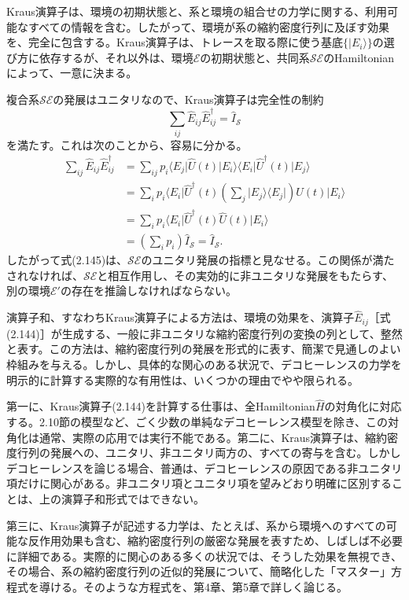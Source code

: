 Kraus演算子は、環境の初期状態と、系と環境の組合せの力学に関する、利用可能なすべての情報を含む。したがって、環境が系の縮約密度行列に及ぼす効果を、完全に包含する。Kraus演算子は、トレースを取る際に使う基底$\{\lvert E_i\rangle\}$の選び方に依存するが、それ以外は、環境$\mathcal E$の初期状態と、共同系$\mathcal{SE}$のHamiltonianによって、一意に決まる。

\hypertarget{srcpage:111}{}\label{srcpage:111}
複合系$\mathcal{SE}$の発展はユニタリなので、Kraus演算子は完全性の制約
\begin{equation}\sum_{ij}\hat E_{ij}\hat E_{ij}^\dagger=\hat I_{\mathcal S}\tag{2.145}\end{equation}
を満たす。これは次のことから、容易に分かる。
\begin{equation}\begin{split}
\sum_{ij}\hat E_{ij}\hat E_{ij}^\dagger&=\sum_{ij}p_i\langle E_j\rvert\hat U(t)\lvert E_i\rangle\langle E_i\rvert\hat U^\dagger(t)\lvert E_j\rangle\\
&=\sum_i p_i\langle E_i\rvert\hat U^\dagger(t)\left(\sum_j\lvert E_j\rangle\langle E_j\rvert\right)\hat U(t)\lvert E_i\rangle\\
&=\sum_i p_i\langle E_i\rvert\hat U^\dagger(t)\hat U(t)\lvert E_i\rangle\\
&=\left(\sum_i p_i\right)\hat I_{\mathcal S}=\hat I_{\mathcal S}.
\end{split}\tag{2.146}\end{equation}
したがって式(2.145)は、$\mathcal{SE}$のユニタリ発展の指標と見なせる。この関係が満たされなければ、$\mathcal{SE}$と相互作用し、その実効的に非ユニタリな発展をもたらす、別の環境$\mathcal E'$の存在を推論しなければならない。

演算子和、すなわちKraus演算子による方法は、環境の効果を、演算子$\hat E_{ij}$［式(2.144)］が生成する、一般に非ユニタリな縮約密度行列の変換の列として、整然と表す。この方法は、縮約密度行列の発展を形式的に表す、簡潔で見通しのよい枠組みを与える。しかし、具体的な関心のある状況で、デコヒーレンスの力学を明示的に計算する実際的な有用性は、いくつかの理由でやや限られる。

第一に、Kraus演算子(2.144)を計算する仕事は、全Hamiltonian$\hat H$の対角化に対応する。2.10節の模型など、ごく少数の単純なデコヒーレンス模型を除き、この対角化は通常、実際の応用では実行不能である。第二に、Kraus演算子は、縮約密度行列の発展への、ユニタリ、非ユニタリ両方の、すべての寄与を含む。しかしデコヒーレンスを論じる場合、普通は、デコヒーレンスの原因である非ユニタリ項だけに関心がある。非ユニタリ項とユニタリ項を望みどおり明確に区別することは、上の演算子和形式ではできない。

\hypertarget{srcpage:112}{}\label{srcpage:112}
第三に、Kraus演算子が記述する力学は、たとえば、系から環境へのすべての可能な反作用効果も含む、縮約密度行列の厳密な発展を表すため、しばしば不必要に詳細である。実際的に関心のある多くの状況では、そうした効果を無視でき、その場合、系の縮約密度行列の近似的発展について、簡略化した「マスター」方程式を導ける。そのような方程式を、第4章、第5章で詳しく論じる。

